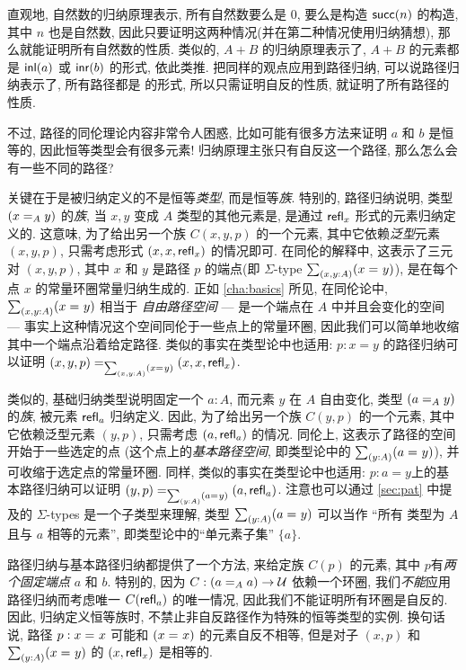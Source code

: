 \begin{rmk}
    \label{rmk:the-only-path-is-refl}
    直观地, 自然数的归纳原理表示, 所有自然数要么是 $0$, 要么是构造 $\suc(n)$ 的构造, 其中 $n$ 也是自然数, 因此只要证明这两种情况(并在第二种情况使用归纳猜想), 那么就能证明所有自然数的性质.
    类似的, $A+B$ 的归纳原理表示了, $A+B$ 的元素都是 $\inl(a)$ 或 $\inr(b)$ 的形式, 依此类推.
    把同样的观点应用到路径归纳, 可以说路径归纳表示了, 所有路径都是  的形式, 所以只需证明自反的性质, 就证明了所有路径的性质.

    不过, 路径的同伦理论内容非常令人困惑, 比如可能有很多方法来证明 $a$ 和 $b$ 是恒等的, 因此恒等类型会有很多元素!
    归纳原理主张只有自反这一个路径, 那么怎么会有一些不同的路径?

    关键在于是被归纳定义的不是恒等\emph{类型}, 而是恒等\emph{族}.
    特别的, 路径归纳说明, 类型 $(\id[A]{x}{y})$ 的\emph{族},  当 $x,y$ 变成 $A$ 类型的其他元素是, 是通过 $\refl{x}$ 形式的元素归纳定义的.
    这意味, 为了给出另一个族 $C(x,y,p)$ 的一个元素, 其中它依赖\emph{泛型}元素 $(x,y,p)$, 只需考虑形式 $(x,x,\refl{x})$ 的情况即可.
    在同伦的解释中, 这表示了三元对 $(x,y,p)$, 其中 $x$ 和 $y$ 是路径 $p$ 的端点(即 $\Sigma$-type $\sm{x,y:A}(\id{x}{y})$), 是在每个点 $x$ 的常量环圈常量归纳生成的.
    正如 \cref{cha:basics} 所见, 在同伦论中, $\sm{x,y:A}(\id{x}{y})$ 相当于 \emph{自由路径空间} --- 是一个端点在 $A$ 中并且会变化的空间 --- 事实上这种情况这个空间同伦于一些点上的常量环圈, 因此我们可以简单地收缩其中一个端点沿着给定路径.
    类似的事实在类型论中也适用: $p:x=y$ 的路径归纳可以证明 $\id[\sm{x,y:A}(\id{x}{y})]{(x,y,p)}{(x,x,\refl{x})}$.

    类似的, 基础归纳类型说明固定一个 $a:A$, 而元素 $y$ 在 $A$ 自由变化, 类型 $(\id[A]{a}{y})$ 的\emph{族}, 被元素 $\refl{a}$ 归纳定义.
    因此, 为了给出另一个族 $C(y,p)$ 的一个元素, 其中它依赖泛型元素 $(y,p)$, 只需考虑 $(a,\refl{a})$ 的情况.
    同伦上, 这表示了路径的空间开始于一些选定的点 (这个点上的\emph{基本路径空间}, 即类型论中的 $\sm{y:A} (\id{a}{y})$), 并可收缩于选定点的常量环圈.
    同样, 类似的事实在类型论中也适用: $p:a=y$上的基本路径归纳可以证明 $\id[\sm{y:A}(\id{a}{y})]{(y,p)}{(a,\refl{a})}$.
    注意也可以通过 \cref{sec:pat} 中提及的 $\Sigma$-types 是一个子类型来理解, 类型 $\sm{y:A}(\id{a}{y})$ 可以当作 ``所有 类型为 $A$ 且与 $a$ 相等的元素'', 即类型论中的``单元素子集'' $\{a\}$.

    路径归纳与基本路径归纳都提供了一个方法, 来给定族 $C(p)$ 的元素, 其中 $p$有\emph{两个固定端点} $a$ 和 $b$.
    特别的, 因为 $C: (\id[A]{a}{a}) \to \UU$ 依赖一个环圈, 我们\emph{不能}应用路径归纳而考虑唯一 $C(\refl{a})$ 的唯一情况, 因此我们不能证明所有环圈是自反的.
    因此, 归纳定义恒等族时, 不禁止非自反路径作为特殊的恒等类型的实例.
    换句话说, 路径 $p:\id{x}{x}$ 可能和 $(\id{x}{x})$ 的元素自反不相等, 但是对子 $(x,p)$ 和 $\sm{y:A}(\id{x}{y})$ 的 $(x,\refl{x})$ 是相等的.


\end{rmk}
